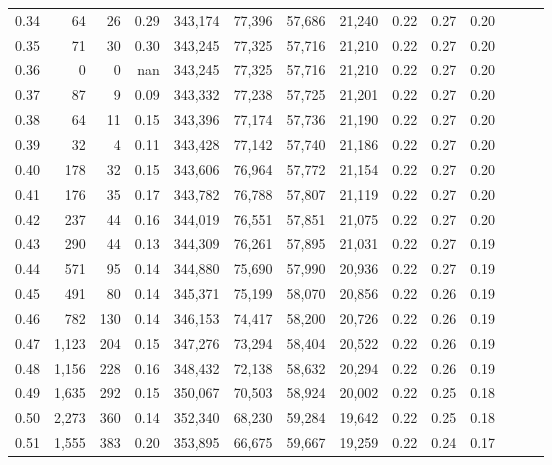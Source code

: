 \begin{tabular}{rrrrrrrrrrrrrr}
0.34 &      64 &     26 &  0.29 &  343,174 &   77,396 &  57,686 &  21,240 &  0.22 &  0.27 &      0.20 \\
0.35 &      71 &     30 &  0.30 &  343,245 &   77,325 &  57,716 &  21,210 &  0.22 &  0.27 &      0.20 \\
0.36 &       0 &      0 &   nan &  343,245 &   77,325 &  57,716 &  21,210 &  0.22 &  0.27 &      0.20 \\
0.37 &      87 &      9 &  0.09 &  343,332 &   77,238 &  57,725 &  21,201 &  0.22 &  0.27 &      0.20 \\
0.38 &      64 &     11 &  0.15 &  343,396 &   77,174 &  57,736 &  21,190 &  0.22 &  0.27 &      0.20 \\
0.39 &      32 &      4 &  0.11 &  343,428 &   77,142 &  57,740 &  21,186 &  0.22 &  0.27 &      0.20 \\
0.40 &     178 &     32 &  0.15 &  343,606 &   76,964 &  57,772 &  21,154 &  0.22 &  0.27 &      0.20 \\
0.41 &     176 &     35 &  0.17 &  343,782 &   76,788 &  57,807 &  21,119 &  0.22 &  0.27 &      0.20 \\
0.42 &     237 &     44 &  0.16 &  344,019 &   76,551 &  57,851 &  21,075 &  0.22 &  0.27 &      0.20 \\
0.43 &     290 &     44 &  0.13 &  344,309 &   76,261 &  57,895 &  21,031 &  0.22 &  0.27 &      0.19 \\
0.44 &     571 &     95 &  0.14 &  344,880 &   75,690 &  57,990 &  20,936 &  0.22 &  0.27 &      0.19 \\
0.45 &     491 &     80 &  0.14 &  345,371 &   75,199 &  58,070 &  20,856 &  0.22 &  0.26 &      0.19 \\
0.46 &     782 &    130 &  0.14 &  346,153 &   74,417 &  58,200 &  20,726 &  0.22 &  0.26 &      0.19 \\
0.47 &   1,123 &    204 &  0.15 &  347,276 &   73,294 &  58,404 &  20,522 &  0.22 &  0.26 &      0.19 \\
0.48 &   1,156 &    228 &  0.16 &  348,432 &   72,138 &  58,632 &  20,294 &  0.22 &  0.26 &      0.19 \\
0.49 &   1,635 &    292 &  0.15 &  350,067 &   70,503 &  58,924 &  20,002 &  0.22 &  0.25 &      0.18 \\
0.50 &   2,273 &    360 &  0.14 &  352,340 &   68,230 &  59,284 &  19,642 &  0.22 &  0.25 &      0.18 \\
0.51 &   1,555 &    383 &  0.20 &  353,895 &   66,675 &  59,667 &  19,259 &  0.22 &  0.24 &      0.17 \\

\end{tabular}
